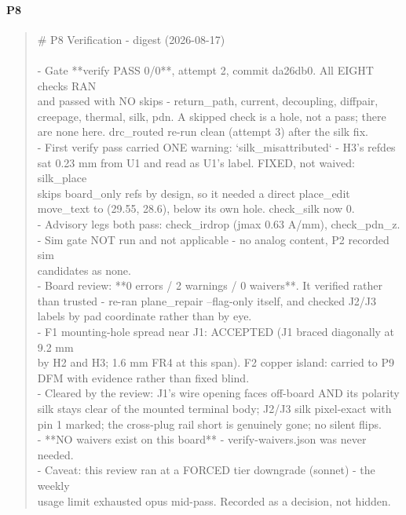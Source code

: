 \documentclass[11pt,a4paper]{article}
\begin{document}
\paragraph*{P8}
\begin{quote}\small\ttfamily\raggedright
\# P8 Verification - digest (2026-08-17)\\
~\\
- Gate {*}{*}verify PASS 0/0{*}{*}, attempt 2, commit da26db0. All EIGHT checks RAN\\
  and passed with NO skips - return\_path, current, decoupling, diffpair,\\
  creepage, thermal, silk, pdn. A skipped check is a hole, not a pass; there\\
  are none here. drc\_routed re-run clean (attempt 3) after the silk fix.\\
- First verify pass carried ONE warning: `silk\_misattributed` - H3's refdes\\
  sat 0.23 mm from U1 and read as U1's label. FIXED, not waived: silk\_place\\
  skips board\_only refs by design, so it needed a direct place\_edit\\
  move\_text to (29.55, 28.6), below its own hole. check\_silk now 0.\\
- Advisory legs both pass: check\_irdrop (jmax 0.63 A/mm), check\_pdn\_z.\\
- Sim gate NOT run and not applicable - no analog content, P2 recorded sim\\
  candidates as none.\\
- Board review: {*}{*}0 errors / 2 warnings / 0 waivers{*}{*}. It verified rather\\
  than trusted - re-ran plane\_repair --flag-only itself, and checked J2/J3\\
  labels by pad coordinate rather than by eye.\\
- F1 mounting-hole spread near J1: ACCEPTED (J1 braced diagonally at 9.2 mm\\
  by H2 and H3; 1.6 mm FR4 at this span). F2 copper island: carried to P9\\
  DFM with evidence rather than fixed blind.\\
- Cleared by the review: J1's wire opening faces off-board AND its polarity\\
  silk stays clear of the mounted terminal body; J2/J3 silk pixel-exact with\\
  pin 1 marked; the cross-plug rail short is genuinely gone; no silent flips.\\
- {*}{*}NO waivers exist on this board{*}{*} - verify-waivers.json was never needed.\\
- Caveat: this review ran at a FORCED tier downgrade (sonnet) - the weekly\\
  usage limit exhausted opus mid-pass. Recorded as a decision, not hidden.
\end{quote}
\end{document}
